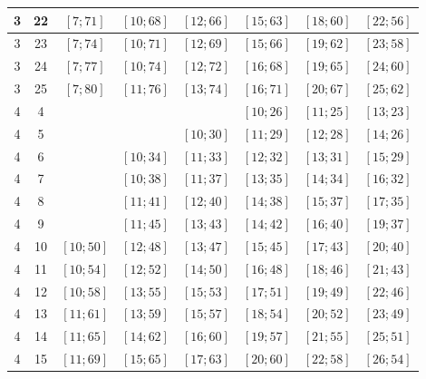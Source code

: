\documentclass[a4paper,12pt]{article}
\begin{document}
\begin{center}
{\begin{longtable}[H]{|c|c|c|c|c|c|c|c|}
3 &  22 &  $\left[ 7; 71\right]$ &  $\left[ 10; 68\right]$ &  $\left[ 12; 66\right]$ &  $\left[ 15; 63\right]$ &  $\left[ 18; 60\right]$ &  $\left[ 22; 56\right]$ \tabularnewline \hline
3 &  23 &  $\left[ 7; 74\right]$ &  $\left[ 10; 71\right]$ &  $\left[ 12; 69\right]$ &  $\left[ 15; 66\right]$ &  $\left[ 19; 62\right]$ &  $\left[ 23; 58\right]$ \tabularnewline \hline
3 &  24 &  $\left[ 7; 77\right]$ &  $\left[ 10; 74\right]$ &  $\left[ 12; 72\right]$ &  $\left[ 16; 68\right]$ &  $\left[ 19; 65\right]$ &  $\left[ 24; 60\right]$ \tabularnewline \hline
3 &  25 &  $\left[ 7; 80\right]$ &  $\left[ 11; 76\right]$ &  $\left[ 13; 74\right]$ &  $\left[ 16; 71\right]$ &  $\left[ 20; 67\right]$ &  $\left[ 25; 62\right]$ \tabularnewline \hline
4 &  4 &   &   &   &  $\left[ 10; 26\right]$ &  $\left[ 11; 25\right]$ &  $\left[ 13; 23\right]$ \tabularnewline \hline
4 &  5 &   &   &  $\left[ 10; 30\right]$ &  $\left[ 11; 29\right]$ &  $\left[ 12; 28\right]$ &  $\left[ 14; 26\right]$ \tabularnewline \hline
4 &  6 &   &  $\left[ 10; 34\right]$ &  $\left[ 11; 33\right]$ &  $\left[ 12; 32\right]$ &  $\left[ 13; 31\right]$ &  $\left[ 15; 29\right]$ \tabularnewline \hline
4 &  7 &   &  $\left[ 10; 38\right]$ &  $\left[ 11; 37\right]$ &  $\left[ 13; 35\right]$ &  $\left[ 14; 34\right]$ &  $\left[ 16; 32\right]$ \tabularnewline \hline
4 &  8 &   &  $\left[ 11; 41\right]$ &  $\left[ 12; 40\right]$ &  $\left[ 14; 38\right]$ &  $\left[ 15; 37\right]$ &  $\left[ 17; 35\right]$ \tabularnewline \hline
4 &  9 &   &  $\left[ 11; 45\right]$ &  $\left[ 13; 43\right]$ &  $\left[ 14; 42\right]$ &  $\left[ 16; 40\right]$ &  $\left[ 19; 37\right]$ \tabularnewline \hline
4 &  10 &  $\left[ 10; 50\right]$ &  $\left[ 12; 48\right]$ &  $\left[ 13; 47\right]$ &  $\left[ 15; 45\right]$ &  $\left[ 17; 43\right]$ &  $\left[ 20; 40\right]$ \tabularnewline \hline
4 &  11 &  $\left[ 10; 54\right]$ &  $\left[ 12; 52\right]$ &  $\left[ 14; 50\right]$ &  $\left[ 16; 48\right]$ &  $\left[ 18; 46\right]$ &  $\left[ 21; 43\right]$ \tabularnewline \hline
4 &  12 &  $\left[ 10; 58\right]$ &  $\left[ 13; 55\right]$ &  $\left[ 15; 53\right]$ &  $\left[ 17; 51\right]$ &  $\left[ 19; 49\right]$ &  $\left[ 22; 46\right]$ \tabularnewline \hline
4 &  13 &  $\left[ 11; 61\right]$ &  $\left[ 13; 59\right]$ &  $\left[ 15; 57\right]$ &  $\left[ 18; 54\right]$ &  $\left[ 20; 52\right]$ &  $\left[ 23; 49\right]$ \tabularnewline \hline
4 &  14 &  $\left[ 11; 65\right]$ &  $\left[ 14; 62\right]$ &  $\left[ 16; 60\right]$ &  $\left[ 19; 57\right]$ &  $\left[ 21; 55\right]$ &  $\left[ 25; 51\right]$ \tabularnewline \hline
4 &  15 &  $\left[ 11; 69\right]$ &  $\left[ 15; 65\right]$ &  $\left[ 17; 63\right]$ &  $\left[ 20; 60\right]$ &  $\left[ 22; 58\right]$ &  $\left[ 26; 54\right]$ \tabularnewline \hline

\end{longtable}}
\end{center}
\end{document}
